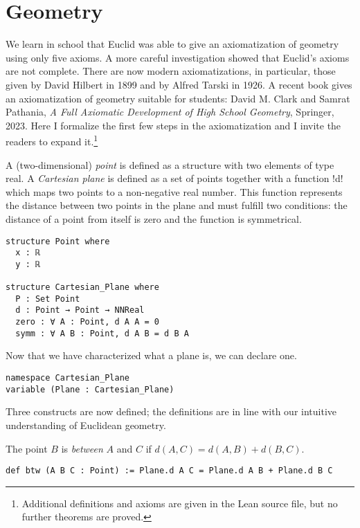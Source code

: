 
\section{Geometry}

We learn in school that Euclid was able to give an axiomatization of geometry using only five axioms. A more careful investigation showed that Euclid's axioms are not complete. There are now modern axiomatizations, in particular, those given by David Hilbert in 1899 and by Alfred Tarski in 1926. A recent book gives an axiomatization of geometry suitable for students: David M. Clark and Samrat Pathania, \textit{A Full Axiomatic Development of High School Geometry}, Springer, 2023. Here I formalize the first few steps in the axiomatization and I invite the readers to expand it.\footnote{Additional definitions and axioms are given in the Lean source file, but no further theorems are proved.}

A (two-dimensional) \emph{point} is defined as a structure with two elements of type real. A \emph{Cartesian plane} is defined as a set of points together with a function !d! which maps two points to a non-negative real number. This function represents the distance between two points in the plane and must fulfill two conditions: the distance of a point from itself is zero and the function is symmetrical.
\begin{Verbatim}
structure Point where
  x : ℝ
  y : ℝ

structure Cartesian_Plane where
  P : Set Point
  d : Point → Point → NNReal
  zero : ∀ A : Point, d A A = 0
  symm : ∀ A B : Point, d A B = d B A
\end{Verbatim}


Now that we have characterized what a plane is, we can declare one.

\begin{Verbatim}[firstnumber=last]
namespace Cartesian_Plane
variable (Plane : Cartesian_Plane)
\end{Verbatim}

Three constructs are now defined; the definitions are in line with our intuitive understanding of Euclidean geometry.

The point $B$ is \emph{between} $A$ and $C$ if $d(A,C)=d(A,B)+d(B,C)$.
\begin{Verbatim}[firstnumber=last]
def btw (A B C : Point) := Plane.d A C = Plane.d A B + Plane.d B C
\end{Verbatim}

